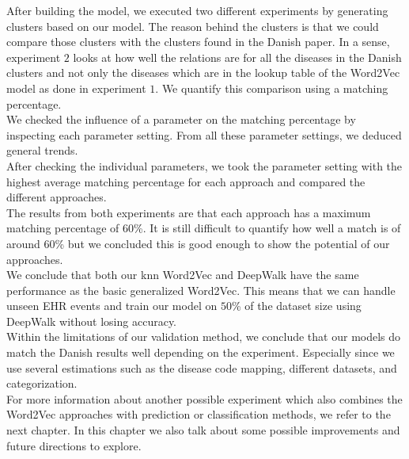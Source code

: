 After building the model, we executed two different experiments by generating clusters based on our model. The reason behind the clusters is that we could compare those clusters with the clusters found in the Danish paper. In a sense, experiment $2$ looks at how well the relations are for all the diseases in the Danish clusters and not only the diseases which are in the lookup table of the Word2Vec model as done in experiment $1$. We quantify this comparison using a matching percentage.  \\
We checked the influence of a parameter on the matching percentage by inspecting each parameter setting. From all these parameter settings, we deduced general trends. \\
After checking the individual parameters, we took the parameter setting with the highest average matching percentage for each approach and compared the different approaches. \\

The results from both experiments are that each approach has a maximum matching percentage of $60$\%. It is still difficult to quantify how well a match is of around $60$\% but we concluded this is good enough to show the potential of our approaches. \\

We conclude that both our knn Word2Vec and DeepWalk have the same performance as the basic generalized Word2Vec. This means that we can handle unseen EHR events and train our model on $50$\% of the dataset size using DeepWalk without losing accuracy. \\
Within the limitations of our validation method, we conclude that our models do match the Danish results well depending on the experiment. Especially since we use several estimations such as the disease code mapping, different datasets, and categorization. \\ 

For more information about another possible experiment which also combines the Word2Vec approaches with prediction or classification methods, we refer to the next chapter. In this chapter we also talk about some possible improvements and future directions to explore.

